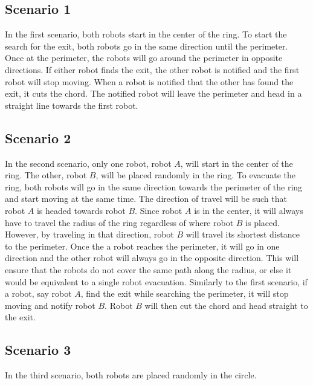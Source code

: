 \documentclass[12pt,letterpaper]{article}
\begin{document}
    \subsection{Scenario 1}
        In the first scenario, both robots start in the center of the ring. To start the search for the exit, both robots go in the same direction until the perimeter. Once at the perimeter, the robots will go around the perimeter in opposite directions. If either robot finds the exit, the other robot is notified and the first robot will stop moving. When a robot is notified that the other has found the exit, it cuts the chord. The notified robot will leave the perimeter and head in a straight line towards the first robot.
        
    \subsection{Scenario 2}
        In the second scenario, only one robot, robot $A$, will start in the center of the ring. The other, robot $B$, will be placed randomly in the ring. To evacuate the ring, both robots will go in the same direction towards the perimeter of the ring and start moving at the same time. The direction of travel will be such that robot $A$ is headed towards robot $B$. Since robot $A$ is in the center, it will always have to travel the radius of the ring regardless of where robot $B$ is placed. However, by traveling in that direction, robot $B$ will travel its shortest distance to the perimeter. Once the a robot reaches the perimeter, it will go in one direction and the other robot will always go in the opposite direction. This will ensure that the robots do not cover the same path along the radius, or else it would be equivalent to a single robot evacuation. Similarly to the first scenario, if a robot, say robot $A$, find the exit while searching the perimeter, it will stop moving and notify robot $B$. Robot $B$ will then cut the chord and head straight to the exit.
    
    \subsection{Scenario 3}
        In the third scenario, both robots are placed randomly in the circle. 
\end{document}
